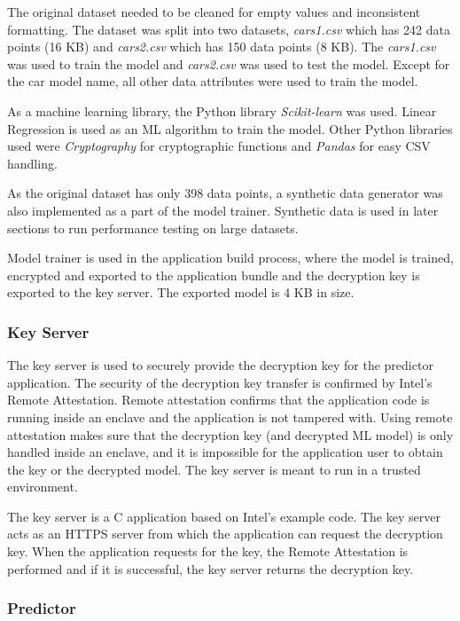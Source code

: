 The original dataset needed to be cleaned for empty values and inconsistent formatting. The dataset was split into two datasets, \textit{cars1.csv} which has 242 data points (16 KB) and \textit{cars2.csv} which has 150 data points (8 KB). The \textit{cars1.csv} was used to train the model and \textit{cars2.csv} was used to test the model. Except for the car model name, all other data attributes were used to train the model.
 
As a machine learning library, the Python library \textit{Scikit-learn}\cite{scikit} was used. Linear Regression is used as an ML algorithm to train the model. Other Python libraries used were \textit{Cryptography} for cryptographic functions and \textit{Pandas} for easy CSV handling.

As the original dataset has only 398 data points, a synthetic data generator was also implemented as a part of the model trainer. Synthetic data is used in later sections to run performance testing on large datasets.

Model trainer is used in the application build process, where the model is trained, encrypted and exported to the application bundle and the decryption key is exported to the key server. The exported model is 4 KB in size.

\subsubsection{Key Server} \label{keyserver}

The key server is used to securely provide the decryption key for the predictor application. The security of the decryption key transfer is confirmed by Intel's Remote Attestation. Remote attestation confirms that the application code is running inside an enclave and the application is not tampered with. Using remote attestation makes sure that the decryption key (and decrypted ML model) is only handled inside an enclave, and it is impossible for the application user to obtain the key or the decrypted model. The key server is meant to run in a trusted environment.

The key server is a C application based on Intel's example code. The key server acts as an HTTPS server from which the application can request the decryption key. When the application requests for the key, the Remote Attestation is performed and if it is successful, the key server returns the decryption key.

\subsubsection{Predictor} \label{predictor}

